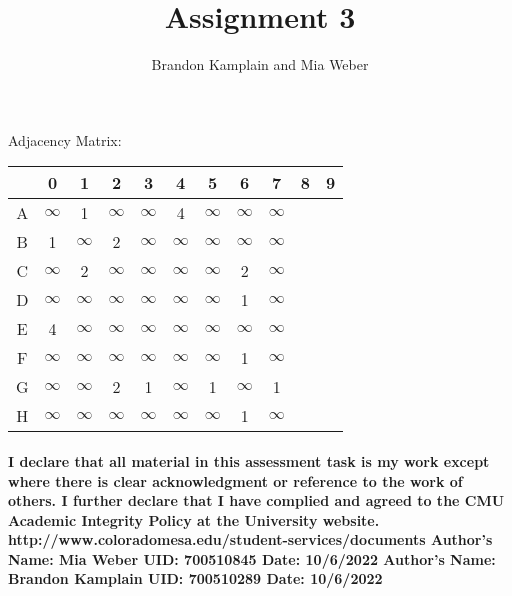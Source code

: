 \documentclass{article}
\begin{document}
\title{Assignment 3}
\author{Brandon Kamplain and Mia Weber}

\maketitle
\newpage

\begin{center}
\noindent Adjacency Matrix:

\begin{tabular}{c || c | c | c | c | c | c | c | c | c | c |} 
 & 0 & 1 & 2 & 3 & 4 & 5 & 6 & 7 & 8 & 9 \\  [0.5ex] 
 \hline\hline
 A & $\infty$ & 1 & $\infty$ & $\infty$ & 4 & $\infty$ & $\infty$ & $\infty$ \\ 
 \hline
 B & 1 & $\infty$ & 2 & $\infty$ & $\infty$ & $\infty$ & $\infty$ & $\infty$ \\
 \hline
 C & $\infty$ & 2 & $\infty$ & $\infty$ & $\infty$ & $\infty$ & 2 & $\infty$ \\
 \hline
 D & $\infty$ & $\infty$ & $\infty$ & $\infty$ & $\infty$ & $\infty$ & 1 & $\infty$ \\
 \hline
 E & 4 & $\infty$ & $\infty$ & $\infty$ & $\infty$ & $\infty$ & $\infty$ & $\infty$ \\ 
  \hline
 F & $\infty$ & $\infty$ & $\infty$ & $\infty$ & $\infty$ & $\infty$ & 1 & $\infty$ \\ 
  \hline
 G & $\infty$ & $\infty$ & 2 & 1 & $\infty$ & 1 & $\infty$ & 1 \\
  \hline
 H & $\infty$ & $\infty$ & $\infty$ & $\infty$ & $\infty$ & $\infty$ & 1 & $\infty$ \\  [1ex] 
 \hline
\end{tabular}
\end{center}

\paragraph{\linebreak I declare that all material in this assessment task is my work except where there is clear acknowledgment or reference to the work of others. I further declare that I have complied and agreed to the CMU Academic Integrity Policy at the University website.
\linebreak  http://www.coloradomesa.edu/student-services/documents
\linebreak \linebreak Author’s Name: Mia Weber UID: 700510845 Date: 10/6/2022
\linebreak Author's Name: Brandon Kamplain UID: 700510289 Date: 10/6/2022}
\end{document}
